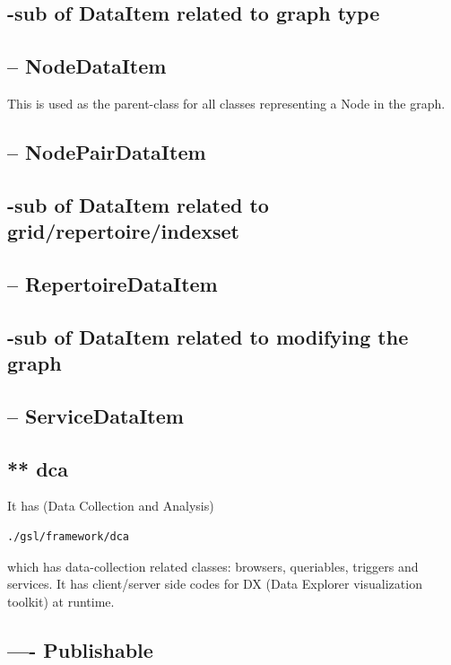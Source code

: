 \subsection{-sub of DataItem related to graph type}
\subsection{-- NodeDataItem}
\label{sec:NodeDataItem}

This is used as the parent-class for all classes representing a Node in the
graph.

\subsection{-- NodePairDataItem}
\label{sec:NodePairDataItem}

\subsection{-sub of DataItem related to grid/repertoire/indexset}
\subsection{-- RepertoireDataItem}
\label{sec:ReprtoireDataItem}


\subsection{-sub of DataItem related to modifying the graph}
\subsection{-- ServiceDataItem}
\label{sec:ServiceDataItem}


\subsection{ ** dca}

It has  (Data Collection and Analysis)
\begin{verbatim}
./gsl/framework/dca
\end{verbatim}
which has data-collection related classes:
browsers, queriables, triggers and services.
It has client/server side codes for DX (Data Explorer visualization toolkit) at
runtime.


\subsection{---- Publishable}
\label{sec:Publishable}

